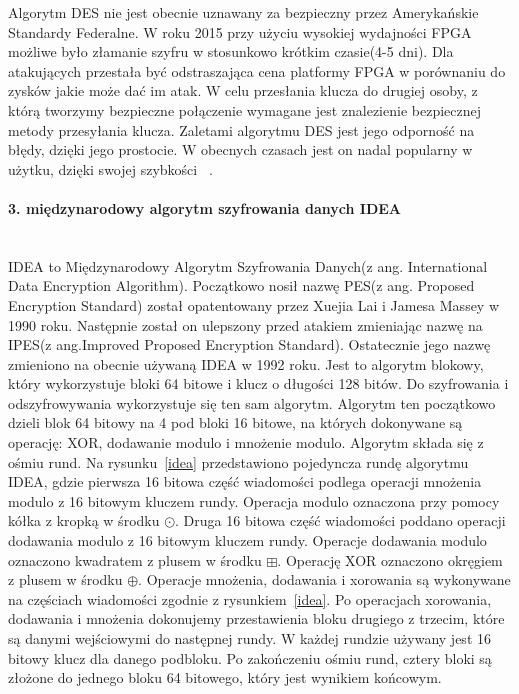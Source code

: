 \documentclass[12p]{article}
\begin{document}
Algorytm DES nie jest obecnie uznawany za bezpieczny przez Amerykańskie Standardy Federalne. W roku 2015 przy użyciu wysokiej wydajności FPGA możliwe było złamanie szyfru w stosunkowo krótkim czasie(4-5 dni). Dla atakujących przestała być odstraszająca cena platformy FPGA w porównaniu do zysków jakie może dać im atak. W celu przesłania klucza do drugiej osoby, z którą tworzymy bezpieczne połączenie wymagane jest znalezienie bezpiecznej metody przesyłania klucza. Zaletami algorytmu DES jest jego odporność na błędy, dzięki jego prostocie. W obecnych czasach jest on nadal popularny w użytku, dzięki swojej szybkości ~\cite{DES}.




\paragraph{3. międzynarodowy algorytm szyfrowania danych IDEA} \mbox{} \\ 

IDEA to Międzynarodowy Algorytm Szyfrowania Danych(z ang. International Data Encryption Algorithm). Początkowo nosił nazwę PES(z ang. Proposed Encryption Standard) został opatentowany przez Xuejia Lai i Jamesa Massey w 1990 roku. Następnie został on ulepszony przed atakiem zmieniając nazwę na IPES(z ang.Improved Proposed Encryption Standard). Ostatecznie jego nazwę zmieniono na obecnie używaną IDEA w 1992 roku. Jest to algorytm blokowy, który wykorzystuje bloki 64 bitowe i klucz o długości 128 bitów. Do szyfrowania i odszyfrowywania wykorzystuje się ten sam algorytm. Algorytm ten początkowo dzieli blok 64 bitowy na 4 pod bloki 16 bitowe, na których dokonywane są operację: XOR, dodawanie modulo i mnożenie modulo. Algorytm składa się z ośmiu rund. Na rysunku~\ref{idea} przedstawiono pojedyncza rundę algorytmu IDEA, gdzie pierwsza 16 bitowa część wiadomości podlega operacji mnożenia modulo z 16 bitowym kluczem rundy. Operacja modulo oznaczona przy pomocy kółka z kropką w środku $\odot$. Druga 16 bitowa część wiadomości poddano operacji dodawania modulo z 16 bitowym kluczem rundy. Operacje dodawania modulo oznaczono kwadratem z plusem w środku $\boxplus$. Operację XOR oznaczono okręgiem z plusem w środku $\oplus$. Operacje mnożenia, dodawania i xorowania są wykonywane na częściach wiadomości zgodnie z rysunkiem~\ref{idea}. Po operacjach xorowania, dodawania i mnożenia dokonujemy przestawienia bloku drugiego z trzecim, które są danymi wejściowymi do następnej rundy. W każdej rundzie używany jest 16 bitowy klucz dla danego podbloku. Po zakończeniu ośmiu rund, cztery bloki są złożone do jednego bloku 64 bitowego, który jest wynikiem końcowym.
\end{document}
